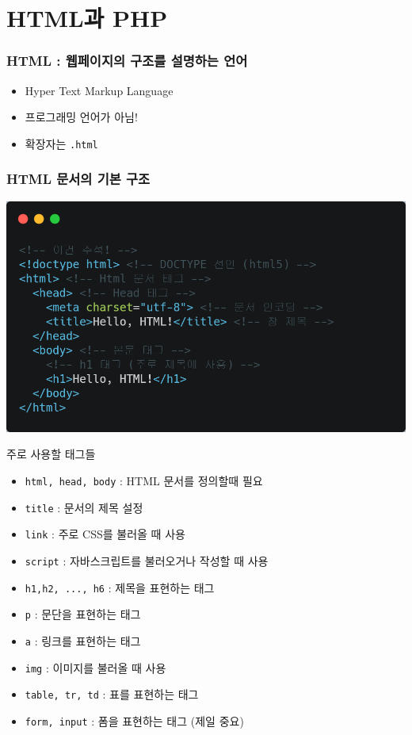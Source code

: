 \documentclass{beamer}
\begin{document}
\section{HTML과 PHP}
    \begin{frame}[fragile]
        \frametitle{HTML : 웹페이지의 구조를 설명하는 언어}
        \begin{itemize}
            \item Hyper Text Markup Language
            \item 프로그래밍 언어가 아님!
            \item 확장자는 \texttt{.html}
        \end{itemize}
    \end{frame}

    \begin{frame}[fragile]
        \frametitle{HTML 문서의 기본 구조}

        \begin{center}
            \includegraphics[height=0.7\textheight]{Images/structure-html.png}
        \end{center}
        
    \end{frame}

    \begin{frame}{주로 사용할 태그들}
        \begin{itemize}
            \item \texttt{html, head, body} : HTML 문서를 정의할때 필요
            \item \texttt{title} : 문서의 제목 설정
            \item \texttt{link} : 주로 CSS를 불러올 때 사용
            \item \texttt{script} : 자바스크립트를 불러오거나 작성할 때 사용
            \item \texttt{h1,h2, ..., h6} : 제목을 표현하는 태그
            \item \texttt{p} : 문단을 표현하는 태그
            \item \texttt{a} : 링크를 표현하는 태그
            \item \texttt{img} : 이미지를 불러올 때 사용
            \item \texttt{table, tr, td} : 표를 표현하는 태그
            \item \texttt{form, input} : 폼을 표현하는 태그 (제일 중요)
        \end{itemize}
    \end{frame}
\end{document}
